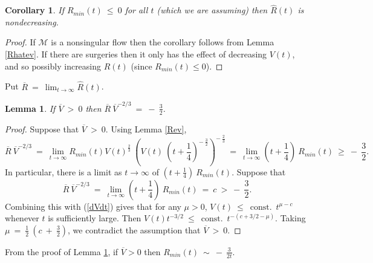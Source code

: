 \documentclass[12pt]{amsart}
\newcommand{\const}{\operatorname{const.}}
\newcommand{\M}{{\mathcal M}}
\numberwithin{equation}{section}
\theoremstyle{plain}
\newtheorem{lemma}[equation]{Lemma}
\newtheorem{corollary}[equation]{Corollary}
\theoremstyle{definition}
\theoremstyle{remark}
\begin{document}
\begin{corollary} \label{Rmono}
If $R_{min}(t) \: \le \: 0$ for all $t$
(which we are assuming) then $\hat{R}(t)$ is nondecreasing.
\end{corollary}
\begin{proof}
If $\M$ is a nonsingular flow then the corollary follows from Lemma \ref{Rhatev}.
If there are surgeries then it only has the effect of decreasing $V(t)$, and so
possibly increasing $\hat{R}(t)$ (since $R_{min}(t) \le 0$).
\end{proof}

Put $\overline{R} \: = \: \lim_{t \rightarrow \infty} \hat{R}(t)$.

\begin{lemma} \label{RVlemma}
If $\overline{V} \: > \: 0$ then
$\overline{R} \: \overline{V}^{-2/3} \: = \: - \: \frac32$.
\end{lemma}
\begin{proof}
Suppose that $\overline{V} \: > \: 0$. 
Using Lemma \ref{Rev},
\begin{equation}
\overline{R} \: \overline{V}^{-2/3}  \: = \:
\lim_{t \rightarrow \infty} R_{min}(t) V(t)^{\frac23} \: 
\left( V(t) \: \left(t + \frac14 \right)^{- \: \frac32} \right)^{- \: \frac23} \: = \:
\lim_{t \rightarrow \infty} \left( t + \frac14 \right) \: R_{min}(t) \: \ge \: - \: \frac32.
\end{equation}
In particular, there is a limit as $t \rightarrow \infty$ of
$\left( t + \frac14 \right) \: R_{min}(t)$.
Suppose that 
\begin{equation}
\overline{R} \: \overline{V}^{-2/3} \: = \: 
\lim_{t \rightarrow \infty} \left( t + \frac14 \right) \: R_{min}(t) \: = \:
c \: > 
\: - \: \frac32.
\end{equation}
Combining this with (\ref{dVdt}) gives that for any $\mu > 0$,
$V(t) \: \le \: \const \:
t^{\mu-c}$ whenever $t$ is sufficiently large. Then
$V(t) t^{-3/2} \: \le \: \const \: t^{-(c+3/2 - \mu)}$.
Taking $\mu \: = \: \frac12 \: (c \: + \: \frac32)$, we
contradict the assumption that $\overline{V} \: > \: 0$.
\end{proof}

From the proof of Lemma \ref{RVlemma},
if $\overline{V} > 0$ then $R_{min}(t) \: \sim \: - \: \frac{3}{2t}$. 
\end{document}
